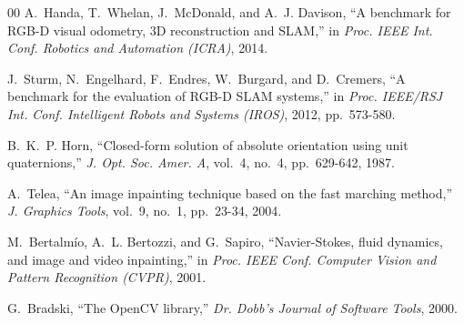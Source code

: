 \documentclass[conference]{IEEEtran}
\begin{document}
\begin{thebibliography}{00}
A.~Handa, T.~Whelan, J.~McDonald, and A.~J. Davison, ``A benchmark for RGB-D
visual odometry, 3D reconstruction and SLAM,'' in \emph{Proc. IEEE Int. Conf.
Robotics and Automation (ICRA)}, 2014.

J.~Sturm, N.~Engelhard, F.~Endres, W.~Burgard, and D.~Cremers, ``A benchmark
for the evaluation of RGB-D SLAM systems,'' in \emph{Proc. IEEE/RSJ Int. Conf.
Intelligent Robots and Systems (IROS)}, 2012, pp.~573-580.

B.~K.~P. Horn, ``Closed-form solution of absolute orientation using unit
quaternions,'' \emph{J. Opt. Soc. Amer. A}, vol.~4, no.~4, pp.~629-642, 1987.

A.~Telea, ``An image inpainting technique based on the fast marching method,''
\emph{J. Graphics Tools}, vol.~9, no.~1, pp.~23-34, 2004.

M.~Bertalm\'{i}o, A.~L. Bertozzi, and G.~Sapiro, ``Navier-Stokes, fluid
dynamics, and image and video inpainting,'' in \emph{Proc. IEEE Conf. Computer
Vision and Pattern Recognition (CVPR)}, 2001.

G.~Bradski, ``The OpenCV library,'' \emph{Dr. Dobb's Journal of Software
Tools}, 2000.

\end{thebibliography}
\end{document}
